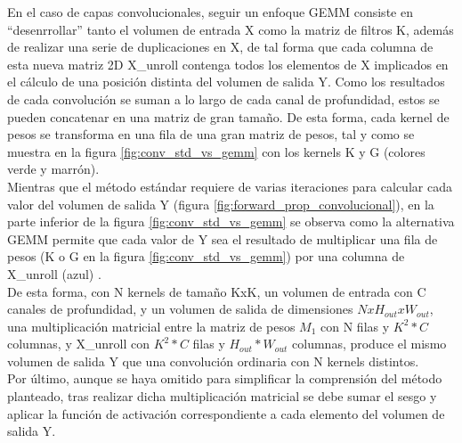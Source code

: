 En el caso de capas convolucionales, seguir un enfoque GEMM consiste en ``desenrrollar'' tanto el volumen de entrada X como la matriz de filtros K, además de realizar una serie de duplicaciones en X, de tal forma que cada columna de esta nueva matriz 2D X\_unroll contenga todos los elementos de X implicados en el cálculo de una posición distinta del volumen de salida Y. Como los resultados de cada convolución se suman a lo largo de cada canal de profundidad, estos se pueden concatenar en una matriz de gran tamaño. De esta forma, cada kernel de pesos se transforma en una fila de una gran matriz de pesos, tal y como se muestra en la figura \ref{fig:conv_std_vs_gemm} con los kernels K y G (colores verde y marrón). \\
Mientras que el método estándar requiere de varias iteraciones para calcular cada valor del volumen de salida Y (figura \ref{fig:forward_prop_convolucional}), en la parte inferior de la figura \ref{fig:conv_std_vs_gemm} se observa como la alternativa GEMM permite que cada valor de Y sea el resultado de multiplicar una fila de pesos (K o G en la figura \ref{fig:conv_std_vs_gemm}) por una columna de X\_unroll (azul) \cite{Programming_Massively}. \\
De esta forma, con N kernels de tamaño KxK, un volumen de entrada con C canales de profundidad, y un volumen de salida de dimensiones $NxH_{out}xW_{out}$, una multiplicación matricial entre la matriz de pesos $M_1$ con N filas y $K^2*C$ columnas, y X\_unroll con $K^2*C$ filas y $H_{out}*W_{out}$ columnas, produce el mismo volumen de salida Y que una convolución ordinaria con N kernels distintos. \\
Por último, aunque se haya omitido para simplificar la comprensión del método planteado, tras realizar dicha multiplicación matricial se debe sumar el sesgo y aplicar la función de activación correspondiente a cada elemento del volumen de salida Y.

